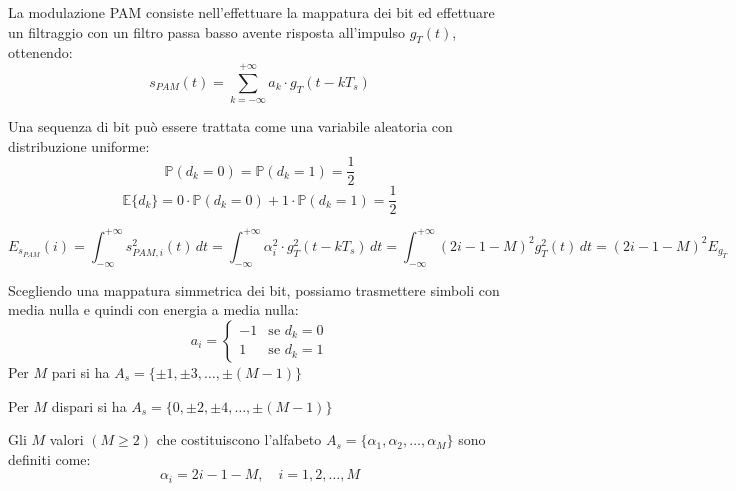 La modulazione PAM consiste nell'effettuare la mappatura dei bit ed effettuare un filtraggio con un filtro passa basso avente risposta all'impulso \( g_T(t) \), ottenendo:
\[ s_{PAM}(t) = \sum_{k=-\infty}^{+\infty} a_k\cdot g_T(t - kT_s) \]

Una sequenza di bit può essere trattata come una variabile aleatoria con distribuzione uniforme:
\[
    \mathbb{P}(d_k = 0) = \mathbb{P}(d_k = 1) = \frac{1}{2} 
\]
\[
    \mathbb{E}\{d_k\} = 0\cdot \mathbb{P}(d_k = 0) + 1\cdot \mathbb{P}(d_k = 1) = \frac{1}{2}
\]


% 
\[
    E_{s_{PAM}}(i) = \int_{-\infty}^{+\infty} s_{PAM, i}^2(t) \, dt =  \int_{-\infty}^{+\infty} \alpha_i^2 \cdot g_T^2(t - kT_s) \, dt = \int_{-\infty}^{+\infty} (2i - 1 - M)^2 g_T^2(t) \, dt = (2i - 1 - M)^2 E_{g_T}
\]

Scegliendo una mappatura simmetrica dei bit, possiamo trasmettere simboli con media nulla e quindi con energia a media nulla:
\[
    a_i = 
    \begin{cases}
        -1 & \text{se } d_k = 0 \\
        1 & \text{se } d_k = 1
    \end{cases}
\]
Per \( M \) pari si ha \( A_s = \{ \pm 1, \pm 3, \ldots, \pm (M-1) \} \)

Per \( M \) dispari si ha \( A_s = \{ 0, \pm 2, \pm 4, \ldots, \pm (M-1) \} \)


Gli \( M \) valori \( (M \geq 2) \) che costituiscono l'alfabeto \( A_s = \{ \alpha_1, \alpha_2, \ldots, \alpha_M \} \) sono definiti come:
\[ \alpha_i = 2i - 1 - M, \quad i = 1, 2, \ldots, M \]




